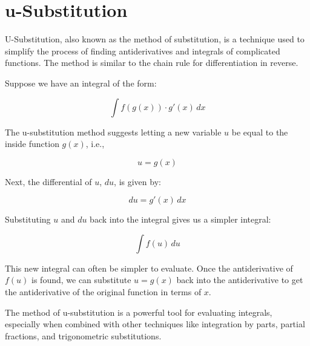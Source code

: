 \chapter{u-Substitution}


U-Substitution, also known as the method of substitution, is a technique used to simplify the process of finding antiderivatives and integrals of complicated functions. The method is similar to the chain rule for differentiation in reverse.

Suppose we have an integral of the form:

\begin{equation}
\int f(g(x)) \cdot g'(x) \, dx
\end{equation}

The u-substitution method suggests letting a new variable $u$ be equal to the inside function $g(x)$, i.e., 

\begin{equation}
u = g(x)
\end{equation}

Next, the differential of $u$, $du$, is given by:

\begin{equation}
du = g'(x) \, dx
\end{equation}

Substituting $u$ and $du$ back into the integral gives us a simpler integral:

\begin{equation}
\int f(u) \, du
\end{equation}

This new integral can often be simpler to evaluate. Once the antiderivative of $f(u)$ is found, we can substitute $u=g(x)$ back into the antiderivative to get the antiderivative of the original function in terms of $x$.

The method of u-substitution is a powerful tool for evaluating integrals, especially when combined with other techniques like integration by parts, partial fractions, and trigonometric substitutions.
